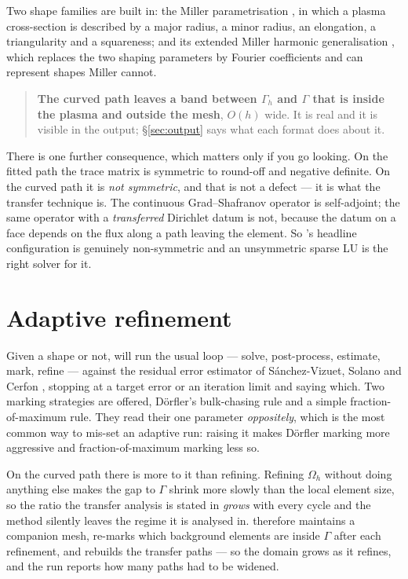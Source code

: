 Two shape families are built in: the Miller parametrisation
\cite{Miller1998}, in which a plasma cross-section is described by a major
radius, a minor radius, an elongation, a triangularity and a squareness; and its
extended Miller harmonic generalisation \cite{ArbonCandyBelli2021}, which
replaces the two shaping parameters by Fourier coefficients and can represent
shapes Miller cannot.

\begin{quote}
	\textbf{The curved path leaves a band between $\Gamma_h$ and $\Gamma$ that
	is inside the plasma and outside the mesh}, $O(h)$ wide. It is real and it
	is visible in the output; \S\ref{sec:output} says what each format does
	about it.
\end{quote}

There is one further consequence, which matters only if you go looking. On the
fitted path the trace matrix is symmetric to round-off and negative definite. On
the curved path it is \emph{not symmetric}, and that is not a defect --- it is
what the transfer technique is. The continuous Grad--Shafranov operator is
self-adjoint; the same operator with a \emph{transferred} Dirichlet datum is
not, because the datum on a face depends on the flux along a path leaving the
element. So {\meq}'s headline configuration is genuinely non-symmetric and an
unsymmetric sparse LU is the right solver for it.

\section{Adaptive refinement}

Given a shape or not, {\meq} will run the usual loop --- solve, post-process,
estimate, mark, refine --- against the residual error estimator of
S\'anchez-Vizuet, Solano and Cerfon \cite{SanchezVizuet2020adaptive}, stopping at
a target error or an iteration limit and saying which. Two marking strategies
are offered, D\"orfler's bulk-chasing rule and a simple fraction-of-maximum rule.
They read their one parameter \emph{oppositely}, which is the most common way to
mis-set an adaptive run: raising it makes D\"orfler marking more aggressive and
fraction-of-maximum marking less so.

On the curved path there is more to it than refining. Refining $\Omega_h$
without doing anything else makes the gap to $\Gamma$ shrink more slowly than
the local element size, so the ratio the transfer analysis is stated in
\emph{grows} with every cycle and the method silently leaves the regime it is
analysed in. {\meq} therefore maintains a companion mesh, re-marks which
background elements are inside $\Gamma$ after each refinement, and rebuilds the
transfer paths --- so the domain grows as it refines, and the run reports how
many paths had to be widened.


